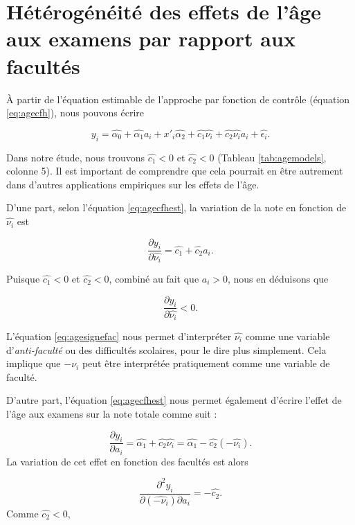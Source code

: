 \documentclass[
]{book}
\begin{document}
\newpage
\setcounter{table}{0}
\setcounter{figure}{0}

\hypertarget{ageheterofac}{%
\section{Hétérogénéité des effets de l'âge aux examens par rapport aux facultés}\label{ageheterofac}}

À partir de l'équation estimable de l'approche par fonction de contrôle (équation \ref{eq:agecfh}), nous pouvons écrire

\begin{equation}
\label{eq:agecfhest}
  y_i = \hat{\alpha_0} + \hat{\alpha_1} a_i + x'_i \hat{\alpha_2} + \hat{c_1} \hat{\nu_i} + \hat{c_2} \hat{\nu_i} a_i + \hat{\epsilon_i}.
\end{equation}

Dans notre étude, nous trouvons \(\hat{c_1} < 0\) et \(\hat{c_2} < 0\) (Tableau \ref{tab:agemodels}, colonne 5). Il est important de comprendre que cela pourrait en être autrement dans d'autres applications empiriques sur les effets de l'âge.

D'une part, selon l'équation \eqref{eq:agecfhest}, la variation de la note en fonction de \(\hat{\nu_i}\) est

\[
\frac{\partial y_i}{\partial \hat{\nu_i}} = \hat{c_1} + \hat{c_2} a_i.
\]

Puisque \(\hat{c_1} < 0\) et \(\hat{c_2} < 0\), combiné au fait que \(a_i > 0\), nous en déduisons que

\begin{equation}
\label{eq:agesignefac}
\frac{\partial y_i}{\partial \hat{\nu_i}} < 0.
\end{equation}

L'équation \eqref{eq:agesignefac} nous permet d'interpréter \(\hat{\nu_i}\) comme une variable d'\emph{anti-faculté} ou des difficultés scolaires, pour le dire plus simplement. Cela implique que \(- \nu_i\) peut être interprétée pratiquement comme une variable de faculté.

\quad D'autre part, l'équation \eqref{eq:agecfhest} nous permet également d'écrire l'effet de l'âge aux examens sur la note totale comme suit :

\[
\frac{\partial y_i}{\partial a_i} = \hat{\alpha_1} + \hat{c_2} \hat{\nu_i} = \hat{\alpha_1} - \hat{c_2}(- \hat{\nu_i}). 
\]
La variation de cet effet en fonction des facultés est alors

\[
\frac{\partial ^ 2 y_i}{\partial (\hat{-\nu_i}) \partial a_i} = - \hat{c_2}.
\]
Comme \(\hat{c_2} < 0\),
\end{document}
